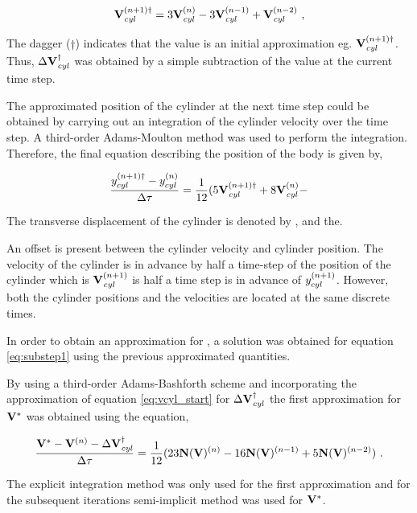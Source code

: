  
\begin{equation} \centering
\label{eq:vcyl_start}
\Vcyl^{(n+1)\dag} = 3\Vcyl^{(n)} - 3\Vcyl^{(n-1)} + \Vcyl^{(n-2)} ~,
\end{equation}


The dagger ($\dag$) indicates that the value is an initial approximation eg. $\mathbf{V}_{\mathit{cyl}}^{(n+1)\dag}$. Thus, $\Delta\mathbf{V}_{\mathit{cyl}}^{\dag}$ was obtained by a simple subtraction of the value at the current time step. 

The approximated position of the cylinder at the next time step could be obtained by carrying out an integration of the cylinder velocity over the time step. A third-order Adams-Moulton method was used to perform the integration. Therefore, the final equation describing the position of the body is given by, 

\begin{equation} \centering
	\label{eq:ycyl_start}
	\frac{\ycyl^{(n+1)\dag} - \ycyl^{(n)}}{\Delta\tau} = \frac{1}{12}(5\Vcyl^{(n+1)\dag} + 8\Vcyl^{(n)} -  
\end{equation}

The transverse displacement of the cylinder is denoted by \ycyl, and the.

An offset is present between the cylinder velocity and cylinder position. The velocity of the cylinder is in advance by half a time-step of the position of the cylinder which is $\mathbf{V}_{\mathit{cyl}}^{(n+1)}$ is half a time step is in advance of $y_{cyl}^{(n+1)}$. However, both the cylinder positions and the velocities are located at the same discrete times.

In order to obtain an approximation for \Vint, a solution was obtained for equation \ref{eq:substep1} using the previous approximated quantities.

By using a third-order Adams-Bashforth scheme and incorporating the approximation of equation \ref{eq:vcyl_start} for  $\Delta\mathbf{V}_{\mathit{cyl}}^{\dag}$ the first approximation for $\mathbf{V}^{*}$ was obtained using the equation,
 
\begin{equation} \centering
\label{eq:vint_first}
\frac{\Vint - \Vn - \Delta\Vcyl^{\dag}}{\Delta\tau} = \frac{1}{12}(23\mathbf{N}(\vecV)^{(n)} - 16\mathbf{N}(\vecV)^{(n-1)} + 5\mathbf{N}(\vecV)^{(n-2)}) ~.
\end{equation}

The explicit integration method was only used for the first approximation and for the subsequent iterations semi-implicit method was used for $\mathbf{V}^{*}$.

